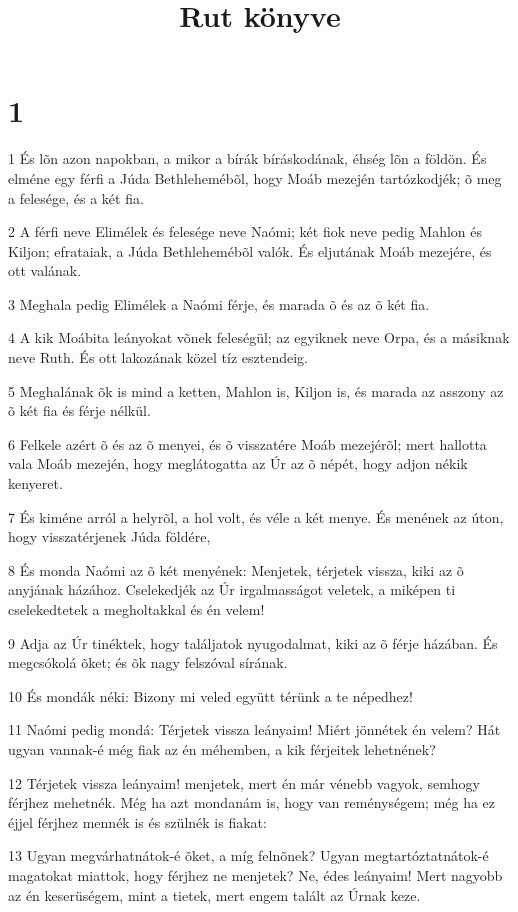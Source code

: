 

\title{Rut könyve}


\chapter{1}

\par 1 És lõn azon napokban, a mikor a bírák bíráskodának, éhség lõn a földön. És elméne egy férfi a Júda Bethlehemébõl, hogy Moáb mezején tartózkodjék; õ meg a felesége, és a két fia.
\par 2 A férfi neve Elimélek és felesége neve Naómi; két fiok neve pedig Mahlon és Kiljon; efrataiak, a Júda Bethlehemébõl valók. És eljutának Moáb mezejére, és ott valának.
\par 3 Meghala pedig Elimélek a Naómi férje, és marada õ és az õ két fia.
\par 4 A kik Moábita leányokat võnek feleségül; az egyiknek neve Orpa, és a másiknak neve Ruth. És ott lakozának közel tíz esztendeig.
\par 5 Meghalának õk is mind a ketten, Mahlon is, Kiljon is, és marada az asszony az õ két fia és férje nélkül.
\par 6 Felkele azért õ és az õ menyei, és õ visszatére Moáb mezejérõl; mert hallotta vala Moáb mezején, hogy meglátogatta az Úr az õ népét, hogy adjon nékik kenyeret.
\par 7 És kiméne arról a helyrõl, a hol volt, és véle a két menye. És menének az úton, hogy visszatérjenek Júda földére,
\par 8 És monda Naómi az õ két menyének: Menjetek, térjetek vissza, kiki az õ anyjának házához. Cselekedjék az Úr irgalmasságot veletek, a miképen ti cselekedtetek a megholtakkal és én velem!
\par 9 Adja az Úr tinéktek, hogy találjatok nyugodalmat, kiki az õ férje házában. És megcsókolá õket; és õk nagy felszóval sírának.
\par 10 És mondák néki: Bizony mi veled együtt térünk a te népedhez!
\par 11 Naómi pedig mondá: Térjetek vissza leányaim! Miért jönnétek én velem? Hát ugyan vannak-é még fiak az én méhemben, a kik férjeitek lehetnének?
\par 12 Térjetek vissza leányaim! menjetek, mert én már vénebb vagyok, semhogy férjhez mehetnék. Még ha azt mondanám is, hogy van reménységem; még ha ez éjjel férjhez mennék is és szülnék is fiakat:
\par 13 Ugyan megvárhatnátok-é õket, a míg felnõnek? Ugyan megtartóztatnátok-é magatokat miattok, hogy férjhez ne menjetek? Ne, édes leányaim! Mert nagyobb az én keserüségem, mint a tietek, mert engem talált az Úrnak keze.
